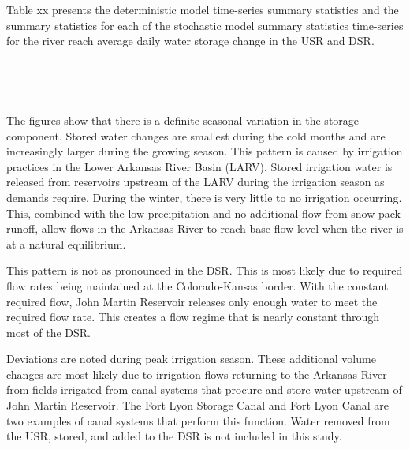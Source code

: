 \begin{linenumbers}
Table xx presents the deterministic model time-series summary statistics and the summary statistics for each of the stochastic model summary statistics time-series for the river reach average daily water storage change in the USR and DSR.
\\
\begin{table}[htbp]
	\centering
		\caption[River reach average daily stored water volume change.]{River reach average daily stored water volume change.  Values in hectare-meters (\si{\hectare\meter}) and values in parentheses in acre-feet (\si{\acre\foot})}
		\label{label}
	\begin{subtable}{\textwidth}
		\centering
		
	\end{subtable}\\
	\tablevspace
	\begin{subtable}{\textwidth}
		\centering
	\end{subtable}\\
\end{table}

The figures show that there is a definite seasonal variation in the storage component.  Stored water changes are smallest during the cold months and are increasingly larger during the growing season.  This pattern is caused by irrigation practices in the Lower Arkansas River Basin (LARV).  Stored irrigation water is released from reservoirs upstream of the LARV during the irrigation season as demands require.  During the winter, there is very little to no irrigation occurring.  This, combined with the low precipitation and no additional flow from snow-pack runoff, allow flows in the Arkansas River to reach base flow level when the river is at a natural equilibrium.

This pattern is not as pronounced in the DSR.  This is most likely due to required flow rates being maintained at the Colorado-Kansas border.  With the constant required flow, John Martin Reservoir releases only enough water to meet the required flow rate.  This creates a flow regime that is nearly constant through most of the DSR. 

Deviations are noted during peak irrigation season.  These additional volume changes are most likely due to irrigation flows returning to the Arkansas River from fields irrigated from canal systems that procure and store water upstream of John Martin Reservoir.  The Fort Lyon Storage Canal and Fort Lyon Canal are two examples of canal systems that perform this function.  Water removed from the USR, stored, and added to the DSR is not included in this study.


\end{linenumbers}
